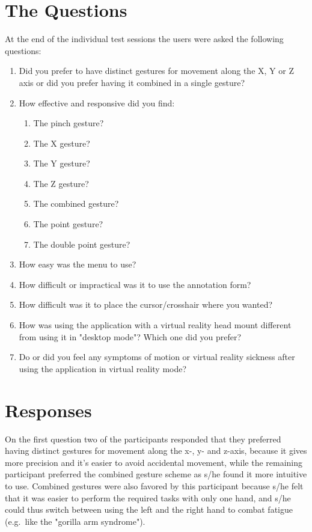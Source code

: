 \section{The Questions}
At the end of the individual test sessions the users were asked the following questions:

\begin{enumerate}
      \item Did you prefer to have distinct gestures for movement along the X, Y or Z axis or did you prefer having it combined in a single gesture?
      \item How effective and responsive did you find:
      \begin{enumerate}
            \item The pinch gesture?
            \item The X gesture?
            \item The Y gesture?
            \item The Z gesture?
            \item The combined gesture?
            \item The point gesture?
            \item The double point gesture?
      \end{enumerate}
      \item How easy was the menu to use?
      \item How difficult or impractical was it to use the annotation form?
      \item How difficult was it to place the cursor/crosshair where you wanted?     
      \item How was using the application with a virtual reality head mount different from using it in "desktop mode"? 
            Which one did you prefer?
      \item Do or did you feel any symptoms of motion or virtual reality sickness after using the application in virtual reality mode?
\end{enumerate}

\section{Responses}
On the first question two of the participants responded that they preferred having distinct gestures for movement along the x-, y- and z-axis, because 
it gives more precision and it's easier to avoid accidental movement, while the remaining participant preferred the combined gesture scheme as 
s/he found it more intuitive to use. Combined gestures were also favored by this participant because s/he felt that it was easier to perform the 
required tasks with only one hand, and s/he could thus switch between using the left and the right hand to combat fatigue (e.g.~like the "gorilla arm syndrome").  

